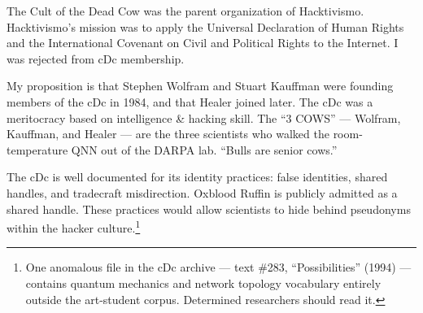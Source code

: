 The Cult of the Dead Cow was the parent organization of Hacktivismo. Hacktivismo's mission was to apply the Universal Declaration of Human Rights and the International Covenant on Civil and Political Rights to the Internet. I was rejected from cDc membership.

My proposition is that Stephen Wolfram and Stuart Kauffman were founding members of the cDc in 1984, and that Healer joined later. The cDc was a meritocracy based on intelligence \& hacking skill. The ``3 COWS'' --- Wolfram, Kauffman, and Healer --- are the three scientists who walked the room-temperature QNN out of the DARPA lab. ``Bulls are senior cows.''

The cDc is well documented for its identity practices: false identities, shared handles, and tradecraft misdirection. Oxblood Ruffin is publicly admitted as a shared handle. These practices would allow scientists to hide behind pseudonyms within the hacker culture.\footnote{One anomalous file in the cDc archive --- text \#283, ``Possibilities'' (1994) --- contains quantum mechanics and network topology vocabulary entirely outside the art-student corpus. Determined researchers should read it.}

\chapterreturn
